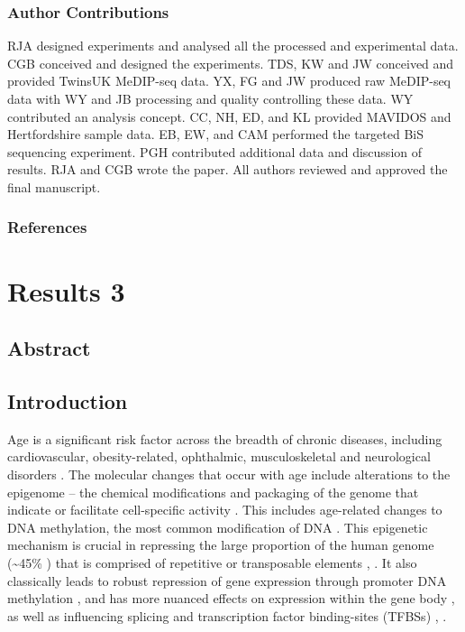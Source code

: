 \documentclass[]{book}
\begin{document}
\hypertarget{author-contributions}{%
\section{Author Contributions}\label{author-contributions}}

RJA designed experiments and analysed all the processed and experimental data.
CGB conceived and designed the experiments.
TDS, KW and JW conceived and provided TwinsUK MeDIP-seq data.
YX, FG and JW produced raw MeDIP-seq data with WY and JB processing and quality controlling these data.
WY contributed an analysis concept.
CC, NH, ED, and KL provided MAVIDOS and Hertfordshire sample data.
EB, EW, and CAM performed the targeted BiS sequencing experiment.
PGH contributed additional data and discussion of results.
RJA and CGB wrote the paper.
All authors reviewed and approved the final manuscript.

\hypertarget{references}{%
\section{References}\label{references}}

\hypertarget{part-results-3}{%
\part{Results 3}\label{part-results-3}}

\hypertarget{abstract-3}{%
\chapter{Abstract}\label{abstract-3}}

\hypertarget{AluIntro}{%
\chapter{Introduction}\label{AluIntro}}

Age is a significant risk factor across the breadth of chronic diseases, including cardiovascular, obesity-related, ophthalmic, musculoskeletal and neurological disorders \citep{Partridge2018}.
The molecular changes that occur with age include alterations to the epigenome \citep{Booth2016} -- the chemical modifications and packaging of the genome that indicate or facilitate cell-specific activity \citep{Bird2007}.
This includes age-related changes to DNA methylation, the most common modification of DNA \citep{Lopez-Otin2013}.
This epigenetic mechanism is crucial in repressing the large proportion of the human genome (\textasciitilde45\% \citep{Gregory2005}) that is comprised of repetitive or transposable elements \citep{Deniz2019}, \citep{Kazazian2017}.
It also classically leads to robust repression of gene expression through promoter DNA methylation \citep{Deaton2011}, and has more nuanced effects on expression within the gene body \citep{Hellman2007}, as well as influencing splicing \citep{Shukla2011} and transcription factor binding-sites (TFBSs) \citep{Blattler2014}, \citep{Yin2017}.
\end{document}

